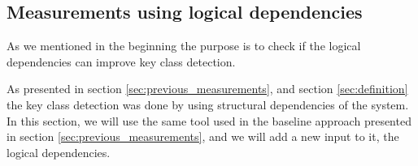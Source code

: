 \documentclass[12pt]{mitthesis}
\begin{document}
\begin{table}[H]
\renewcommand{\arraystretch}{1}
\captionsetup{font=scriptsize}
\caption{Found systems and versions of the systems in GitHub. }
\label{tab:gitfoundsystems}
\centering
{}
\end{table}



\subsection{Measurements using logical dependencies}
\label{sec:current_measurements}

As we mentioned in the beginning the purpose is to check if the logical dependencies can improve key class detection. 

As presented in section \ref{sec:previous_measurements}, and section \ref{sec:definition} the key class detection was done by using structural dependencies of the system. 
In this section, we will use the same tool used in the baseline approach presented in section \ref{sec:previous_measurements}, and we will add a new input to it, the logical dependencies. 
\end{document}
